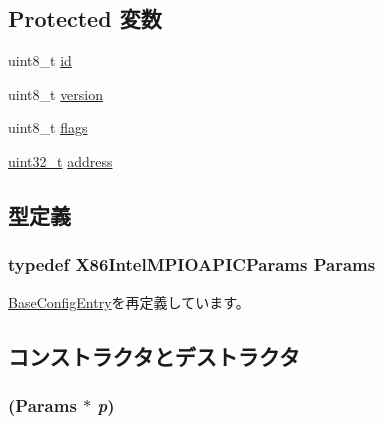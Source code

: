 \subsection*{Protected 変数}
\begin{DoxyCompactItemize}
\item 
uint8\_\-t \hyperlink{classX86ISA_1_1IntelMP_1_1IOAPIC_a1e6927fa1486224044e568f9c370519b}{id}
\item 
uint8\_\-t \hyperlink{classX86ISA_1_1IntelMP_1_1IOAPIC_ab22abc2906422da61885ac6c8e6a1a59}{version}
\item 
uint8\_\-t \hyperlink{classX86ISA_1_1IntelMP_1_1IOAPIC_aa2585d779da0ab21273a8d92de9a0ebe}{flags}
\item 
\hyperlink{Type_8hh_a435d1572bf3f880d55459d9805097f62}{uint32\_\-t} \hyperlink{classX86ISA_1_1IntelMP_1_1IOAPIC_ac0d31ca829f934cccd89f8054e02773e}{address}
\end{DoxyCompactItemize}


\subsection{型定義}
\hypertarget{classX86ISA_1_1IntelMP_1_1IOAPIC_a438b479c81decb727ac32c221cdb909f}{
\subsubsection[{Params}]{\setlength{\rightskip}{0pt plus 5cm}typedef X86IntelMPIOAPICParams {\bf Params}}}
\label{classX86ISA_1_1IntelMP_1_1IOAPIC_a438b479c81decb727ac32c221cdb909f}


\hyperlink{classX86ISA_1_1IntelMP_1_1BaseConfigEntry_a94814126eb2e681fbf4837ed24d18616}{BaseConfigEntry}を再定義しています。

\subsection{コンストラクタとデストラクタ}
\hypertarget{classX86ISA_1_1IntelMP_1_1IOAPIC_a625de1acba45ea5a08893b4f1f0f4d07}{
\subsubsection[{IOAPIC}]{ ({\bf Params} $\ast$ {\em p})}}
\label{classX86ISA_1_1IntelMP_1_1IOAPIC_a625de1acba45ea5a08893b4f1f0f4d07}



